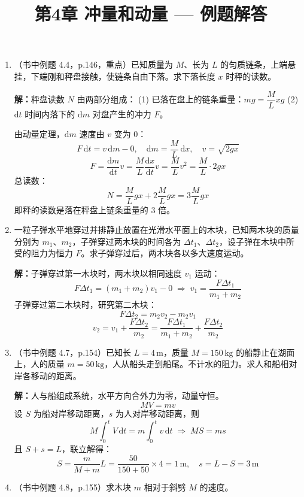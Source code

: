 \documentclass{ctexart}
\title{\textbf{第4章 冲量和动量} --- 例题解答}
\author{}
\date{}
\begin{document}
\maketitle

\begin{enumerate}

\item（书中例题 4.4，p.146，重点）已知质量为 $M$、长为 $L$ 的匀质链条，上端悬挂，下端刚和秤盘接触，使链条自由下落。求下落长度 $x$ 时秤的读数。

\textbf{解：}秤盘读数 $N$ 由两部分组成：
(1) 已落在盘上的链条重量：$m g = \dfrac{M}{L} x g$
(2) $\mathrm{d}t$ 时间内落下的 $\mathrm{d}m$ 对盘产生的冲力 $F$。

由动量定理，$\mathrm{d}m$ 速度由 $v$ 变为 $0$：
\[
F\,\mathrm{d}t = v\,\mathrm{d}m - 0,\quad \mathrm{d}m = \frac{M}{L}\,\mathrm{d}x,\quad v = \sqrt{2gx}
\]
\[
F = \frac{\mathrm{d}m}{\mathrm{d}t} v = \frac{M}{L}\frac{\mathrm{d}x}{\mathrm{d}t} v = \frac{M}{L} v^{2} = \frac{M}{L}\cdot 2gx
\]
总读数：
\[
N = \frac{M}{L} gx + 2\frac{M}{L} gx = 3\frac{M}{L} gx
\]
即秤的读数是落在秤盘上链条重量的 3 倍。

\item 一粒子弹水平地穿过并排静止放置在光滑水平面上的木块，已知两木块的质量分别为 $m_1$、$m_2$，子弹穿过两木块的时间各为 $\Delta t_1$、$\Delta t_2$，设子弹在木块中所受的阻力为恒力 $F$。求子弹穿过后，两木块各以多大速度运动。

\textbf{解：}子弹穿过第一木块时，两木块以相同速度 $v_1$ 运动：
\[
F\Delta t_1 = (m_1 + m_2)v_1 - 0 \;\Longrightarrow\; v_1 = \frac{F\Delta t_1}{m_1 + m_2}
\]
子弹穿过第二木块时，研究第二木块：
\[
F\Delta t_2 = m_2 v_2 - m_2 v_1
\]
\[
v_2 = v_1 + \frac{F\Delta t_2}{m_2} = \frac{F\Delta t_1}{m_1 + m_2} + \frac{F\Delta t_2}{m_2}
\]

\item（书中例题 4.7，p.154）已知长 $L = 4\,\text{m}$，质量 $M = 150\,\text{kg}$ 的船静止在湖面上，人的质量 $m = 50\,\text{kg}$，人从船头走到船尾。不计水的阻力。求人和船相对岸各移动的距离。

\textbf{解：}人与船组成系统，水平方向合外力为零，动量守恒。
\[
MV = mv
\]
设 $S$ 为船对岸移动距离，$s$ 为人对岸移动距离，则
\[
M\int_0^t V\,\mathrm{d}t = m\int_0^t v\,\mathrm{d}t \;\Longrightarrow\; MS = ms
\]
且 $S + s = L$，联立解得：
\[
S = \frac{m}{M+m}L = \frac{50}{150+50}\times 4 = 1\,\text{m},\quad
s = L - S = 3\,\text{m}
\]

\item（书中例题 4.8，p.155）求木块 $m$ 相对于斜劈 $M$ 的速度。


\end{enumerate}
\end{document}
